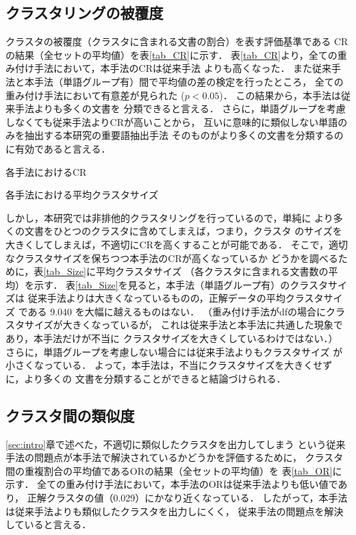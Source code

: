\documentclass[japanese]{jnlp_1.4}
\begin{document}
{\subsection{クラスタリングの被覆度} \label{subsec:CR}

クラスタの被覆度（クラスタに含まれる文書の割合）を表す評価基準である
CRの結果（全セットの平均値）を表\ref{tab_CR}に示す．
表\ref{tab_CR}より，全ての重み付け手法において，本手法のCRは従来手法
よりも高くなった．
また従来手法と本手法（単語グループ有）間で平均値の差の検定を行ったところ，
全ての重み付け手法において有意差が見られた ({$p<0.05$})．
この結果から，本手法は従来手法よりも多くの文書を
分類できると言える．
さらに，単語グループを考慮しなくても従来手法よりCRが高いことから，
互いに意味的に類似しない単語のみを抽出する本研究の重要語抽出手法
そのものがより多くの文書を分類するのに有効であると言える．

\begin{table}[t]
    \caption{各手法におけるCR} \label{tab_CR}

\end{table}
\begin{table}[t]
    \caption{各手法における平均クラスタサイズ} \label{tab_Size}

\end{table}


しかし，本研究では非排他的クラスタリングを行っているので，単純に
より多くの文書をひとつのクラスタに含めてしまえば，つまり，クラスタ
のサイズを大きくしてしまえば，不適切にCRを高くすることが可能である．
そこで，適切なクラスタサイズを保ちつつ本手法のCRが高くなっているか
どうかを調べるために，表\ref{tab_Size}に平均クラスタサイズ
（各クラスタに含まれる文書数の平均）を示す．
表\ref{tab_Size}を見ると，本手法（単語グループ有）のクラスタサイズは
従来手法よりは大きくなっているものの，正解データの平均クラスタサイズ
である 9.040 を大幅に越えるものはない．
（重み付け手法がdfの場合にクラスタサイズが大きくなっているが，
これは従来手法と本手法に共通した現象であり，本手法だけが不当に
クラスタサイズを大きくしているわけではない．）
さらに，単語グループを考慮しない場合には従来手法よりもクラスタサイズ
が小さくなっている．
よって，本手法は，不当にクラスタサイズを大きくせずに，より多くの
文書を分類することができると結論づけられる．


\subsection{クラスタ間の類似度}

\ref{sec:intro}章で述べた，不適切に類似したクラスタを出力してしまう
という従来手法の問題点が本手法で解決されているかどうかを評価するために，
クラスタ間の重複割合の平均値であるORの結果（全セットの平均値）を
表\ref{tab_OR}に示す．
全ての重み付け手法において，本手法のORは従来手法よりも低い値であり，
正解クラスタの値（0.029）にかなり近くなっている．
したがって，本手法は従来手法よりも類似したクラスタを出力しにくく，
従来手法の問題点を解決していると言える．

}
\end{document}
